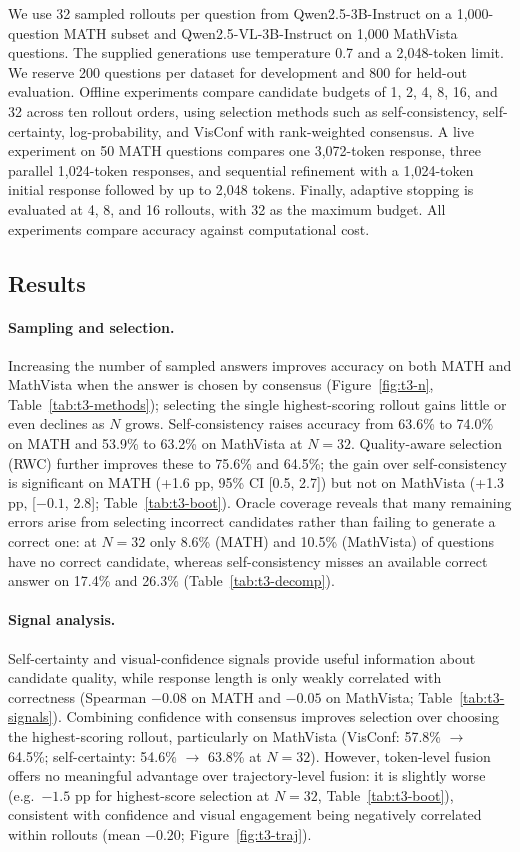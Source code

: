 \documentclass{article}
\begin{document}
We use 32 sampled rollouts per question from Qwen2.5-3B-Instruct on a 1,000-question MATH subset and Qwen2.5-VL-3B-Instruct on 1,000 MathVista questions. The supplied generations use temperature 0.7 and a 2,048-token limit. We reserve 200 questions per dataset for development and 800 for held-out evaluation. Offline experiments compare candidate budgets of 1, 2, 4, 8, 16, and 32 across ten rollout orders, using selection methods such as self-consistency, self-certainty, log-probability, and VisConf with rank-weighted consensus. A live experiment on 50 MATH questions compares one 3,072-token response, three parallel 1,024-token responses, and sequential refinement with a 1,024-token initial response followed by up to 2,048 tokens. Finally, adaptive stopping is evaluated at 4, 8, and 16 rollouts, with 32 as the maximum budget. All experiments compare accuracy against computational cost.

\subsection{Results}
\label{sec:tts-results}

\paragraph{Sampling and selection.}
Increasing the number of sampled answers improves accuracy on both MATH and MathVista when the answer is chosen by consensus (Figure~\ref{fig:t3-n}, Table~\ref{tab:t3-methods}); selecting the single highest-scoring rollout gains little or even declines as $N$ grows. Self-consistency raises accuracy from 63.6\% to 74.0\% on MATH and 53.9\% to 63.2\% on MathVista at $N{=}32$. Quality-aware selection (RWC) further improves these to 75.6\% and 64.5\%; the gain over self-consistency is significant on MATH (+1.6 pp, 95\% CI [0.5, 2.7]) but not on MathVista (+1.3 pp, [$-0.1$, 2.8]; Table~\ref{tab:t3-boot}). Oracle coverage reveals that many remaining errors arise from selecting incorrect candidates rather than failing to generate a correct one: at $N{=}32$ only 8.6\% (MATH) and 10.5\% (MathVista) of questions have no correct candidate, whereas self-consistency misses an available correct answer on 17.4\% and 26.3\% (Table~\ref{tab:t3-decomp}).

\paragraph{Signal analysis.}
Self-certainty and visual-confidence signals provide useful information about candidate quality, while response length is only weakly correlated with correctness (Spearman $-0.08$ on MATH and $-0.05$ on MathVista; Table~\ref{tab:t3-signals}). Combining confidence with consensus improves selection over choosing the highest-scoring rollout, particularly on MathVista (VisConf: 57.8\% $\rightarrow$ 64.5\%; self-certainty: 54.6\% $\rightarrow$ 63.8\% at $N{=}32$). However, token-level fusion offers no meaningful advantage over trajectory-level fusion: it is slightly worse (e.g.\ $-1.5$ pp for highest-score selection at $N{=}32$, Table~\ref{tab:t3-boot}), consistent with confidence and visual engagement being negatively correlated within rollouts (mean $-0.20$; Figure~\ref{fig:t3-traj}).
\end{document}

